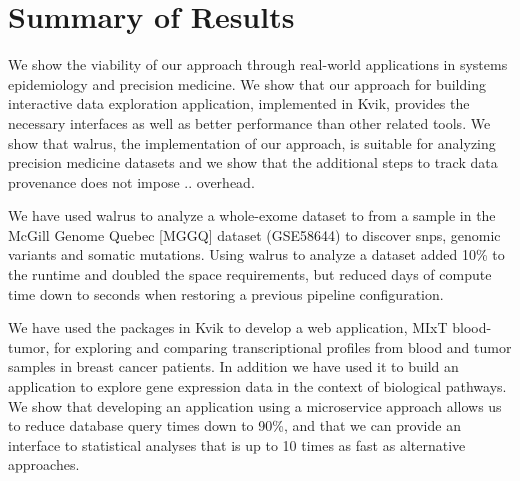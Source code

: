 
\section{Summary of Results} 

We show the viability of our approach through real-world applications in systems
epidemiology and precision medicine. We show that our approach for building
interactive data exploration application, implemented in Kvik, provides the
necessary interfaces as well as better performance than other related tools. 
We
show that walrus, the implementation of our approach, is suitable for analyzing
precision medicine datasets and we show that the additional steps to track data
provenance does not impose .. overhead. 

We have used walrus to analyze a whole-exome dataset to from a sample in the
McGill Genome Quebec [MGGQ] dataset (GSE58644)\cite{tofigh2014prognostic} to
discover \glspl{snp}, genomic variants and somatic mutations. Using walrus to
analyze a dataset added 10\% to the runtime and doubled the space requirements,
but reduced days of compute time down to seconds when restoring a previous
pipeline configuration. 

We have used the packages in Kvik to develop a web application, MIxT
blood-tumor, for exploring and comparing transcriptional profiles from blood and
tumor samples in breast cancer patients. 
In addition we have used it to build an
application to explore gene expression data in the context of biological
pathways. We show that developing an application using a microservice approach
allows us to reduce database query times down to 90\%, and that we can provide
an interface to statistical analyses that is up to 10 times as fast as
alternative approaches. 

